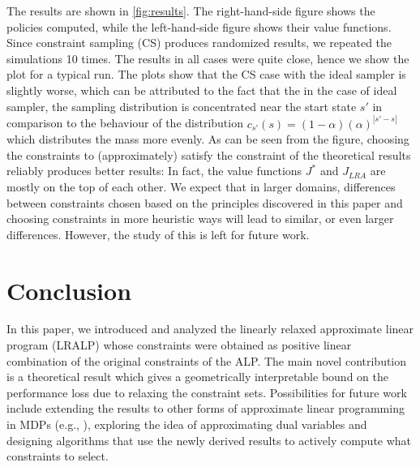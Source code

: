 \documentclass[12pt,draftcls,onecolumn]{IEEEtran}
\begin{document}
The results are shown in \cref{fig:results}.
The right-hand-side figure shows the policies computed,
while the left-hand-side figure shows their value functions.
Since constraint sampling (CS) produces randomized results,
we repeated the simulations 10 times.
The results in all cases were quite close, hence we show the plot for a typical run. The plots show that the CS case with the ideal sampler is slightly worse, which can be attributed to the fact that the in the case of ideal sampler, the sampling distribution is concentrated near the start state $s'$ in comparison to the behaviour of the distribution $c_{s'}(s)=(1-\alpha)(\alpha)^{|s'-s|}$ which distributes the mass more evenly.
As can be seen from the figure, choosing the constraints to (approximately) satisfy the constraint of the theoretical results
reliably produces better results: In fact, the value functions $J^*$ and $J_{LRA}$ are mostly on the top of each other.
We expect that in larger domains, differences between constraints chosen based on the principles discovered in this paper and choosing constraints in more heuristic ways will lead to similar, or even larger differences. 
However, the study of this is left for future work.

\section{Conclusion}
In this paper, we introduced and analyzed the linearly relaxed approximate linear program (LRALP) whose constraints were obtained as positive linear combination of the original constraints of the ALP.
The main novel contribution is a theoretical result which gives a geometrically interpretable bound on the performance loss due to relaxing the constraint sets. Possibilities for future work include extending the results to other forms of approximate linear programming in MDPs (e.g., \citep{SALP}), exploring the idea of approximating dual variables and
designing algorithms that use the newly derived results to actively compute what constraints to select. 





\printbibliography
\newpage
\onecolumn
%
\end{document}
